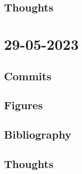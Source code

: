 \documentclass{article}
\begin{document}
\subsection{Thoughts}

\section{29-05-2023}
\subsection{Commits}
\subsection{Figures}
\subsection{Bibliography}
\subsection{Thoughts}
\end{document}
